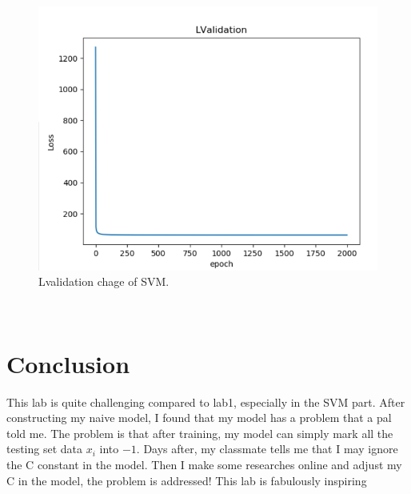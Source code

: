 \documentclass[journal, a4paper]{IEEEtran}
\begin{document}
\begin{figure}[!hbt]
		\begin{center}
		\includegraphics[width=\columnwidth]{SVM.png}
		\caption{Lvalidation chage of SVM.}
		\label{fig3}
		\end{center}
\end{figure}
\par
\quad \\


\section{Conclusion}
	This lab is quite challenging compared to lab1, especially in the SVM part. After constructing my naive model, I found that my model has a problem that a pal told me. The problem is that after training, my model can simply mark all the testing set data $x_i$ into $-1$. Days after, my classmate tells me that I may ignore the C constant in the model. Then I make some researches online and adjust my C in the model, the problem is addressed! This lab is fabulously inspiring

\end{document}

